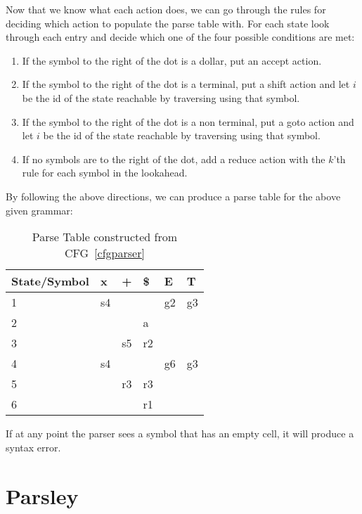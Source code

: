 Now that we know what each action does, we can go through the rules for deciding which action to populate the parse table with. For each state look through each entry and decide which one of the four possible conditions are met:
\begin{enumerate}
  \item If the symbol to the right of the dot is a dollar, put an accept action.
  \item If the symbol to the right of the dot is a terminal, put a shift action and let $i$ be the id of the state reachable by traversing using that symbol.
  \item If the symbol to the right of the dot is a non terminal, put a goto action and let $i$ be the id of the state reachable by traversing using that symbol.
  \item If no symbols are to the right of the dot, add a reduce action with the $k$'th rule for each symbol in the lookahead.
\end{enumerate}

By following the above directions, we can produce a parse table for the above given grammar:

\begin{table}[H]
  \centering
  \begin{tabular}{|l|lll|ll|}
  \hline
  State/Symbol & x  & +  & \$ & E  & T  \\ \hline
  1            & s4 &    &    & g2 & g3 \\
  2            &    &    & a  &    &    \\
  3            &    & s5 & r2 &    &    \\
  4            & s4 &    &    & g6 & g3 \\
  5            &    & r3 & r3 &    &    \\
  6            &    &    & r1 &    &    \\ \hline
  \end{tabular}
  \caption*{Parse Table constructed from CFG~\ref{cfgparser}}
\end{table}
If at any point the parser sees a symbol that has an empty cell, it will produce a syntax error.

\section{Parsley}

